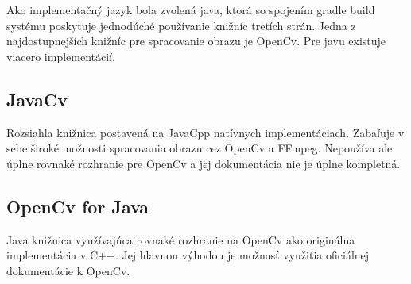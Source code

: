 Ako implementačný jazyk bola zvolená java, ktorá so spojením gradle build systému poskytuje jednodúché používanie knižníc tretích strán. Jedna z najdostupnejších knižníc pre spracovanie obrazu je OpenCv. Pre javu existuje viacero implementácií.

\subsection{JavaCv}

Rozsiahla knižnica postavená na JavaCpp natívnych implementáciach.  Zabaľuje v sebe široké možnosti spracovania obrazu cez OpenCv a FFmpeg. Nepoužíva ale úplne rovnaké rozhranie pre OpenCv a jej dokumentácia nie je úplne kompletná\cite{bytedeco42:online}.

\subsection{OpenCv for Java}

Java knižnica využívajúca rovnaké rozhranie na OpenCv ako originálna implementácia v C++.  Jej hlavnou výhodou je  možnosť využitia oficiálnej dokumentácie k OpenCv\cite{openpnpo16:online}.